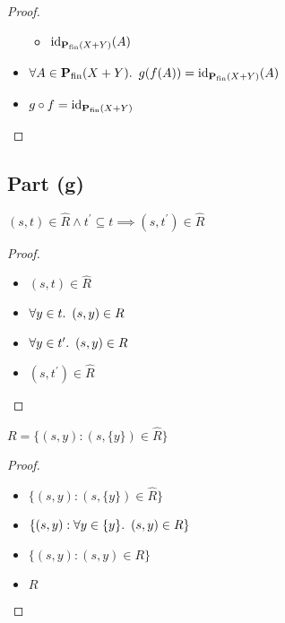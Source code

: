 \begin{prop}
\begin{proof}
\begin{itemize}
\begin{itemize}
          \item[\eqs]
            $\operatorname{id}_{\mathbf{P}_{\operatorname{fin}}(X + Y)}(A)$
        \end{itemize}

      \item[\imps]
        $\forall A\in\mathbf{P}_{\operatorname{fin}}(X+Y)\ldotp~g(f(A)) = \operatorname{id}_{\mathbf{P}_{\operatorname{fin}}(X+Y)}(A)$

      \item[\imps]
        $g\circ f = \operatorname{id}_{\mathbf{P}_{\operatorname{fin}}(X+Y)}$
        \qedhere
        \marginnote{\Def-$=$}
    \end{itemize}
  \end{proof}
\end{prop}

\subsection{Part (g)}\label{sec:q-2-g}

\begin{prop}\label{prop:rel-hat-subset}
  $(s,t)\in\widehat{R}\land t^\prime\subseteq t\implies (s,t^\prime)\in\widehat{R}$
  \begin{proof}~\\
    \begin{itemize}
      \item[\phantom{\imps}]
        $(s,t)\in\widehat{R}$
        \marginnote{\Hyp}

      \item[\iffs]
        $\forall y\in t\ldotp~(s,y)\in R$

      \item[\imps]
        $\forall y\in t^\prime\ldotp~(s,y)\in R$

      \item[\iffs]
        $(s, t^\prime)\in\widehat{R}$
        \qedhere
    \end{itemize}
  \end{proof}
\end{prop}

\begin{prop}\label{prop:rel-rel-hat}
  $R = \{(s,y) : (s,\{y\})\in\widehat{R}\}$
  \begin{proof}~\\
    \begin{itemize}
      \item[\phs] $\{(s,y):(s,\{y\})\in\widehat{R}\}$

      \item[\eqs] $\{(s,y):\forall y\in\{y\}\ldotp~(s,y)\in R\}$

      \item[\eqs] $\{(s,y):(s,y)\in R\}$

      \item[\eqs] $R$\qedhere
    \end{itemize}
  \end{proof}
\end{prop}

